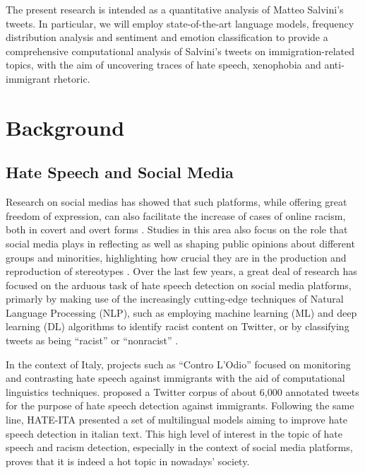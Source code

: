 \documentclass[11pt]{article}
\begin{document}
The present research is intended as a quantitative analysis of Matteo Salvini's tweets. In particular, we will employ state-of-the-art language models, frequency distribution analysis and sentiment and emotion classification to provide a comprehensive computational analysis of Salvini's tweets on immigration-related topics, with the aim of uncovering traces of hate speech, xenophobia and anti-immigrant rhetoric.  
\section{Background}

\subsection{Hate Speech and Social Media}

Research on social medias has showed that such platforms, while offering great freedom of expression, can also facilitate the increase of cases of online racism, both in covert and overt forms \citep{sukanya2023racism}. Studies in this area also focus on the role that social media plays in reflecting as well as shaping public opinions about different groups and minorities, highlighting how crucial they are in the production and reproduction of stereotypes \citep{lorenzetti2020anti}.
Over the last few years, a great deal of  research has focused on the arduous task of hate speech detection on social media platforms, primarly by making use of the increasingly cutting-edge techniques of Natural Language Processing (NLP), such as employing machine learning (ML) and deep learning (DL) algorithms to identify racist content on Twitter, or by classifying tweets as being “racist” or “nonracist” \citep{sukanya2023racism, kwok2013locate}.

In the context of Italy, projects such as “Contro L’Odio” \citep{capozzi2020contro} focused on monitoring and contrasting hate speech against immigrants with the aid of computational linguistics techniques. \citet{sanguinetti2018italian} proposed a Twitter corpus of about 6,000 annotated tweets for the purpose of hate speech detection against immigrants.
Following the same line, HATE-ITA \citep{nozza2022hate} presented a set of multilingual models aiming to improve hate speech detection in italian text. 
This high level of interest in the topic of hate speech and racism detection, especially in the context of social media platforms, proves that it is indeed a hot topic in nowadays' society. 
\end{document}
